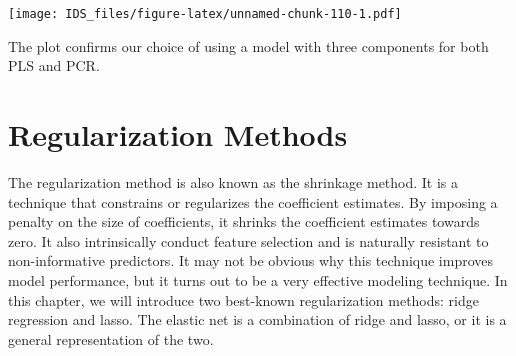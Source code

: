\documentclass[12pt,]{krantz}
\makeatletter
\newenvironment{Shaded}{\begin{snugshade}}{\end{snugshade}}
\newcommand{\CommentTok}[1]{\textcolor[rgb]{0.37,0.37,0.37}{\textit{#1}}}
\newcommand{\DataTypeTok}[1]{\textcolor[rgb]{0.27,0.27,0.27}{#1}}
\newcommand{\DecValTok}[1]{\textcolor[rgb]{0.06,0.06,0.06}{#1}}
\newcommand{\KeywordTok}[1]{\textcolor[rgb]{0.27,0.27,0.27}{\textbf{#1}}}
\newcommand{\NormalTok}[1]{#1}
\newcommand{\OperatorTok}[1]{\textcolor[rgb]{0.43,0.43,0.43}{\textbf{#1}}}
\newcommand{\StringTok}[1]{\textcolor[rgb]{0.5,0.5,0.5}{#1}}
\newenvironment{kframe}{%
\medskip{}
\setlength{\fboxsep}{.8em}
 \def\at@end@of@kframe{}%
 \ifinner\ifhmode%
  \def\at@end@of@kframe{\end{minipage}}%
  \begin{minipage}{\columnwidth}%
 \fi\fi%
 \def\FrameCommand##1{\hskip\@totalleftmargin \hskip-\fboxsep
 \colorbox{shadecolor}{##1}\hskip-\fboxsep
     \hskip-\linewidth \hskip-\@totalleftmargin \hskip\columnwidth}%
 \MakeFramed {\advance\hsize-\width
   \@totalleftmargin\z@ \linewidth\hsize
   \@setminipage}}%
 {\par\unskip\endMakeFramed%
 \at@end@of@kframe}
\renewenvironment{Shaded}{\begin{kframe}}{\end{kframe}}
\makeatother
\begin{document}
\begin{Shaded}
\end{Shaded}

\texttt{[image: IDS\_files/figure-latex/unnamed-chunk-110-1.pdf]}

The plot confirms our choice of using a model with three components for both PLS and PCR.

\hypertarget{regularization-methods}{%
\chapter{Regularization Methods}\label{regularization-methods}}

The regularization method is also known as the shrinkage method. It is a technique that constrains or regularizes the coefficient estimates. By imposing a penalty on the size of coefficients, it shrinks the coefficient estimates towards zero. It also intrinsically conduct feature selection and is naturally resistant to non-informative predictors. It may not be obvious why this technique improves model performance, but it turns out to be a very effective modeling technique. In this chapter, we will introduce two best-known regularization methods: ridge regression and lasso. The elastic net is a combination of ridge and lasso, or it is a general representation of the two.
\end{document}
